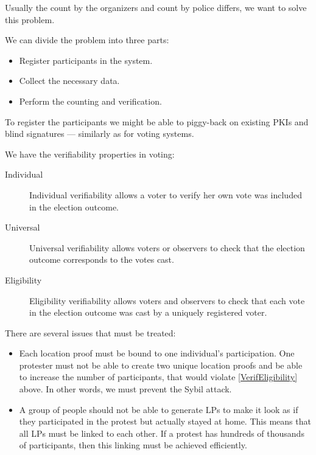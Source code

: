 Usually the count by the organizers and count by police differs, we want to 
solve this problem.

We can divide the problem into three parts:
\begin{itemize}
  \item Register participants in the system.
  \item Collect the necessary data.
  \item Perform the counting and verification.
\end{itemize}

To register the participants we might be able to piggy-back on existing 
\acp{PKI} and blind signatures --- similarly as for voting systems.

We have the verifiability properties in voting:
\begin{description}
  \item[Individual] Individual verifiability allows a voter to verify her own 
    vote was included in the election outcome.
  \item[Universal] Universal verifiability allows voters or observers to check 
    that the election outcome corresponds to the votes cast.
  \item[Eligibility] Eligibility verifiability allows voters and observers to 
    check that each vote in the election outcome was cast by a uniquely 
    registered voter.
\end{description}

There are several issues that must be treated:
\begin{itemize}
  \item Each location proof must be bound to one individual's participation.
    One protester must not be able to create two unique location proofs and be 
    able to increase the number of participants, that would violate 
    \cref{VerifEligibility} above.
    In other words, we must prevent the Sybil attack.

  \item A group of people should not be able to generate \acp{LP} to make it 
    look as if they participated in the protest but actually stayed at home.
    This means that all \acp{LP} must be linked to each other.
    If a protest has hundreds of thousands of participants, then this linking 
    must be achieved efficiently.
\end{itemize}



